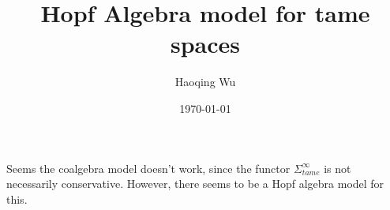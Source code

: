 \documentclass[a4paper, 11pt]{book}
\title{Hopf Algebra model for tame spaces}
\author{Haoqing Wu}
\date{\today}
\begin{document}
\maketitle
\tableofcontents






\appendix




Seems the coalgebra model doesn't work, since the functor $\Sigma^{\infty}_{tame}$ is not necessarily conservative.
However, there seems to be a Hopf algebra model for this.







\clearpage


\end{document}
